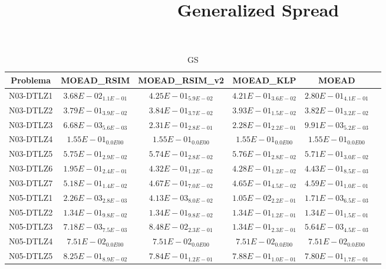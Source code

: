 \documentclass{article}
\title{Generalized Spread}
\author{}
\begin{document}
\maketitle
\begin{table*}[ht!]
\scriptsize
\caption{GS}
\centering\begin{tabular}{|c||c||c||c||c||c|} \hline
Problema &MOEAD_RSIM &MOEAD_RSIM_v2 &MOEAD_KLP &MOEAD\\\hline
N03-DTLZ1 &\cellcolor{gray95}$3.68E-02_{1.1E-01}$ &$4.25E-01_{5.9E-02}$ &$4.21E-01_{3.6E-02}$ &\cellcolor{gray25}$2.80E-01_{4.1E-01}$\\ 
\hline
N03-DTLZ2 &\cellcolor{gray95}$3.79E-01_{3.9E-02}$ &$3.84E-01_{3.7E-02}$ &$3.93E-01_{1.5E-02}$ &\cellcolor{gray25}$3.82E-01_{3.2E-02}$\\ 
\hline
N03-DTLZ3 &\cellcolor{gray95}$6.68E-03_{5.6E-03}$ &$2.31E-01_{2.8E-01}$ &$2.28E-01_{2.2E-01}$ &\cellcolor{gray25}$9.91E-03_{5.2E-03}$\\ 
\hline
N03-DTLZ4 &\cellcolor{gray95}$1.55E-01_{0.0E00}$ &\cellcolor{gray25}$1.55E-01_{0.0E00}$ &$1.55E-01_{0.0E00}$ &$1.55E-01_{0.0E00}$\\ 
\hline
N03-DTLZ5 &$5.75E-01_{2.9E-02}$ &\cellcolor{gray25}$5.74E-01_{2.8E-02}$ &$5.76E-01_{2.8E-02}$ &\cellcolor{gray95}$5.71E-01_{3.0E-02}$\\ 
\hline
N03-DTLZ6 &\cellcolor{gray95}$1.95E-01_{2.4E-01}$ &$4.32E-01_{1.2E-02}$ &\cellcolor{gray25}$4.28E-01_{1.2E-02}$ &$4.43E-01_{8.5E-03}$\\ 
\hline
N03-DTLZ7 &$5.18E-01_{1.4E-02}$ &$4.67E-01_{7.0E-02}$ &\cellcolor{gray25}$4.65E-01_{4.5E-02}$ &\cellcolor{gray95}$4.59E-01_{1.0E-01}$\\ 
\hline
N05-DTLZ1 &\cellcolor{gray25}$2.26E-03_{2.8E-03}$ &$4.13E-03_{8.0E-02}$ &$1.05E-02_{2.2E-01}$ &\cellcolor{gray95}$1.71E-03_{6.5E-03}$\\ 
\hline
N05-DTLZ2 &\cellcolor{gray95}$1.34E-01_{9.8E-02}$ &\cellcolor{gray25}$1.34E-01_{9.8E-02}$ &$1.34E-01_{1.2E-01}$ &$1.34E-01_{1.5E-01}$\\ 
\hline
N05-DTLZ3 &\cellcolor{gray25}$7.18E-03_{7.5E-03}$ &$8.48E-02_{2.3E-01}$ &$1.34E-01_{2.3E-01}$ &\cellcolor{gray95}$5.64E-03_{4.5E-03}$\\ 
\hline
N05-DTLZ4 &\cellcolor{gray95}$7.51E-02_{0.0E00}$ &\cellcolor{gray25}$7.51E-02_{0.0E00}$ &$7.51E-02_{0.0E00}$ &$7.51E-02_{0.0E00}$\\ 
\hline
N05-DTLZ5 &$8.25E-01_{8.9E-02}$ &\cellcolor{gray25}$7.84E-01_{1.2E-01}$ &$7.88E-01_{1.0E-01}$ &\cellcolor{gray95}$7.80E-01_{1.7E-01}$\\ 

\end{tabular}
\end{table*}
\end{document}
